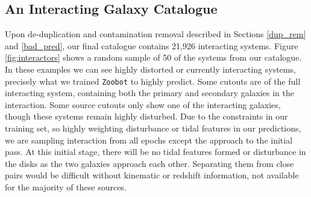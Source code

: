 {\subsection{An Interacting Galaxy Catalogue}\label{int_cat}
\noindent Upon de-duplication and contamination removal described in Sections \ref{dup_rem} and \ref{bad_pred}, our final catalogue contains 21,926 interacting systems. Figure \ref{fig:interactors} shows a random sample of 50 of the systems from our catalogue. In these examples we can see highly distorted or currently interacting systems, precisely what we trained \texttt{Zoobot} to highly predict. Some cutouts are of the full interacting system, containing both the primary and secondary galaxies in the interaction. Some source cutouts only show one of the interacting galaxies, though these systems remain highly disturbed. Due to the constraints in our training set, so highly weighting disturbance or tidal features in our predictions, we are sampling interaction from all epochs except the approach to the initial pass. At this initial stage, there will be no tidal features formed or disturbance in the disks as the two galaxies approach each other. Separating them from close pairs would be difficult without kinematic or redshift information, not available for the majority of these sources.

}
